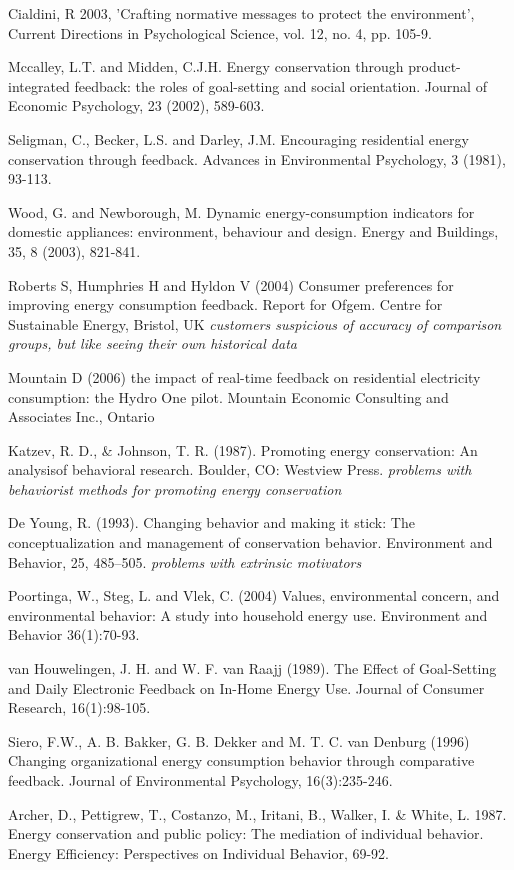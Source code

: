 Cialdini, R 2003, 'Crafting normative messages to protect the environment', Current Directions in Psychological Science, vol. 12, no. 4, pp. 105-9.

Mccalley, L.T. and Midden, C.J.H. Energy conservation through product-integrated feedback: the roles of goal-setting and social orientation. Journal of Economic Psychology, 23 (2002), 589-603.

Seligman, C., Becker, L.S. and Darley, J.M. Encouraging residential energy conservation through feedback. Advances in Environmental Psychology, 3 (1981), 93-113.

Wood, G. and Newborough, M. Dynamic energy-consumption indicators for domestic appliances: environment, behaviour and design. Energy and Buildings, 35, 8 (2003), 821-841.

Roberts S, Humphries H and Hyldon V (2004) Consumer preferences for improving energy consumption feedback. Report for Ofgem. Centre for Sustainable Energy, Bristol, UK \emph{customers suspicious of accuracy of comparison groups, but like seeing their own historical data}

Mountain D (2006) the impact of real-time feedback on residential electricity consumption: the Hydro One pilot. Mountain Economic Consulting and Associates Inc., Ontario

Katzev, R. D., \& Johnson, T. R. (1987). Promoting energy conservation: An analysisof behavioral research. Boulder, CO: Westview Press. \emph{problems with behaviorist methods for promoting energy conservation}

De Young, R. (1993). Changing behavior and making it stick: The conceptualization and management of conservation behavior. Environment and Behavior, 25, 485–505. \emph{problems with extrinsic motivators}

Poortinga, W., Steg, L. and Vlek, C. (2004) Values, environmental concern, and environmental behavior: A study into household energy use. Environment and Behavior 36(1):70-93.  

van Houwelingen, J. H. and W. F. van Raajj (1989). The Effect of Goal-Setting and Daily Electronic Feedback on In-Home Energy Use. Journal of Consumer Research, 16(1):98-105.

Siero, F.W., A. B. Bakker, G. B. Dekker and M. T. C. van Denburg (1996) Changing organizational energy consumption behavior through comparative feedback. Journal of Environmental Psychology, 16(3):235-246.

Archer, D., Pettigrew, T., Costanzo, M., Iritani, B., Walker, I. & White, L. 1987. Energy conservation and public policy: The mediation of individual behavior. Energy Efficiency: Perspectives on Individual Behavior, 69-92.

